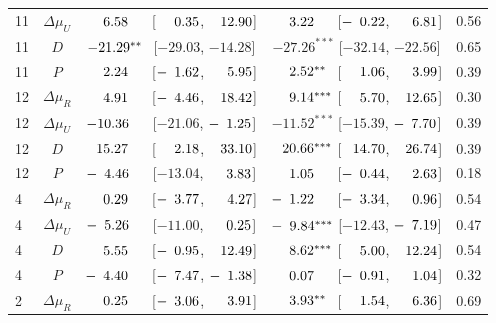 \begin{longtable}{lcccc}
11 & $\Delta\mu_{U}$ & $\hphantom{-}\hphantom{0}6.58^{\hphantom{***}}$ [$\hphantom{-}\hphantom{0}0.35$, $\hphantom{-}12.90$] & $\hphantom{-}\hphantom{0}3.22^{\hphantom{***}}$ [$-\hphantom{0}0.22$, $\hphantom{-}\hphantom{0}6.81$] & 0.56 \\
11 & $D$ & $-21.29^{**\hphantom{*}}$ [$-29.03$, $-14.28$] & $-27.26^{***}$ [$-32.14$, $-22.56$] & 0.65 \\
11 & $P$ & $\hphantom{-}\hphantom{0}2.24^{\hphantom{***}}$ [$-\hphantom{0}1.62$, $\hphantom{-}\hphantom{0}5.95$] & $\hphantom{-}\hphantom{0}2.52^{**\hphantom{*}}$ [$\hphantom{-}\hphantom{0}1.06$, $\hphantom{-}\hphantom{0}3.99$] & 0.39 \\
12 & $\Delta\mu_{R}$ & $\hphantom{-}\hphantom{0}4.91^{\hphantom{***}}$ [$-\hphantom{0}4.46$, $\hphantom{-}18.42$] & $\hphantom{-}\hphantom{0}9.14^{***}$ [$\hphantom{-}\hphantom{0}5.70$, $\hphantom{-}12.65$] & 0.30 \\
12 & $\Delta\mu_{U}$ & $-10.36^{\hphantom{***}}$ [$-21.06$, $-\hphantom{0}1.25$] & $-11.52^{***}$ [$-15.39$, $-\hphantom{0}7.70$] & 0.39 \\
12 & $D$ & $\hphantom{-}15.27^{\hphantom{***}}$ [$\hphantom{-}\hphantom{0}2.18$, $\hphantom{-}33.10$] & $\hphantom{-}20.66^{***}$ [$\hphantom{-}14.70$, $\hphantom{-}26.74$] & 0.39 \\
12 & $P$ & $-\hphantom{0}4.46^{\hphantom{***}}$ [$-13.04$, $\hphantom{-}\hphantom{0}3.83$] & $\hphantom{-}\hphantom{0}1.05^{\hphantom{***}}$ [$-\hphantom{0}0.44$, $\hphantom{-}\hphantom{0}2.63$] & 0.18 \\
4 & $\Delta\mu_{R}$ & $\hphantom{-}\hphantom{0}0.29^{\hphantom{***}}$ [$-\hphantom{0}3.77$, $\hphantom{-}\hphantom{0}4.27$] & $-\hphantom{0}1.22^{\hphantom{***}}$ [$-\hphantom{0}3.34$, $\hphantom{-}\hphantom{0}0.96$] & 0.54 \\
4 & $\Delta\mu_{U}$ & $-\hphantom{0}5.26^{\hphantom{***}}$ [$-11.00$, $\hphantom{-}\hphantom{0}0.25$] & $-\hphantom{0}9.84^{***}$ [$-12.43$, $-\hphantom{0}7.19$] & 0.47 \\
4 & $D$ & $\hphantom{-}\hphantom{0}5.55^{\hphantom{***}}$ [$-\hphantom{0}0.95$, $\hphantom{-}12.49$] & $\hphantom{-}\hphantom{0}8.62^{***}$ [$\hphantom{-}\hphantom{0}5.00$, $\hphantom{-}12.24$] & 0.54 \\
4 & $P$ & $-\hphantom{0}4.40^{\hphantom{***}}$ [$-\hphantom{0}7.47$, $-\hphantom{0}1.38$] & $\hphantom{-}\hphantom{0}0.07^{\hphantom{***}}$ [$-\hphantom{0}0.91$, $\hphantom{-}\hphantom{0}1.04$] & 0.32 \\
\midrule
2 & $\Delta\mu_{R}$ & $\hphantom{-}\hphantom{0}0.25^{\hphantom{***}}$ [$-\hphantom{0}3.06$, $\hphantom{-}\hphantom{0}3.91$] & $\hphantom{-}\hphantom{0}3.93^{**\hphantom{*}}$ [$\hphantom{-}\hphantom{0}1.54$, $\hphantom{-}\hphantom{0}6.36$] & 0.69 \\

\end{longtable}
